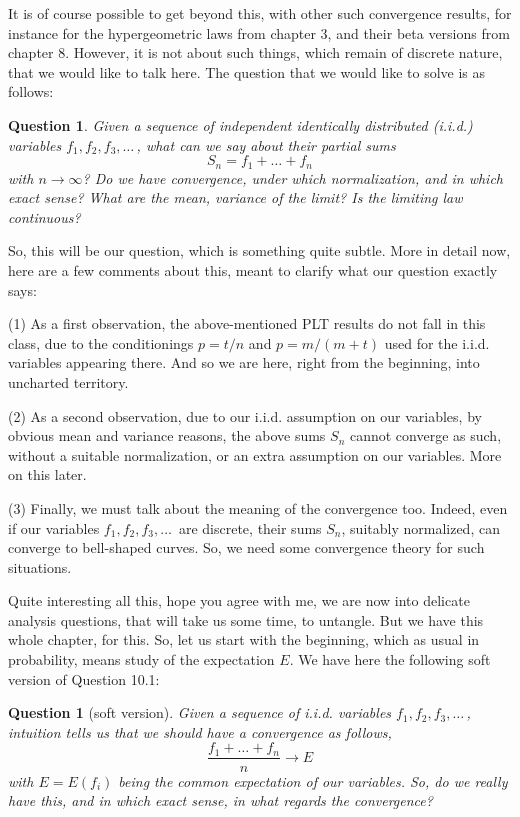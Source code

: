 \documentclass[12pt]{amsbook}
\newtheorem{question}[theorem]{Question}
\begin{document}
It is of course possible to get beyond this, with other such convergence results, for instance for the hypergeometric laws from chapter 3, and their beta versions from chapter 8. However, it is not about such things, which remain of discrete nature, that we would like to talk here. The question that we would like to solve is as follows:

\begin{question}
Given a sequence of independent identically distributed (i.i.d.) variables $f_1,f_2,f_3,\ldots\,$, what can we say about their partial sums
$$S_n=f_1+\ldots+f_n$$
with $n\to\infty$? Do we have convergence, under which normalization, and in which exact sense? What are the mean, variance of the limit? Is the limiting law continuous?
\end{question}

So, this will be our question, which is something quite subtle. More in detail now, here are a few comments about this, meant to clarify what our question exactly says:

\bigskip

(1) As a first observation, the above-mentioned PLT results do not fall in this class, due to the conditionings $p=t/n$ and $p=m/(m+t)$ used for the i.i.d. variables appearing there. And so we are here, right from the beginning, into uncharted territory.

\bigskip

(2) As a second observation, due to our i.i.d. assumption on our variables, by obvious mean and variance reasons, the above sums $S_n$ cannot converge as such, without a suitable normalization, or an extra assumption on our variables. More on this later.

\bigskip

(3) Finally, we must talk about the meaning of the convergence too. Indeed, even if our variables $f_1,f_2,f_3,\ldots\,$ are discrete, their sums $S_n$, suitably normalized, can converge to bell-shaped curves. So, we need some convergence theory for such situations.

\bigskip

Quite interesting all this, hope you agree with me, we are now into delicate analysis questions, that will take us some time, to untangle. But we have this whole chapter, for this. So, let us start with the beginning, which as usual in probability, means study of the expectation $E$. We have here the following soft version of Question 10.1:

\begin{question}[soft version]
Given a sequence of i.i.d. variables $f_1,f_2,f_3,\ldots\,$, intuition tells us that we should have a convergence as follows,
$$\frac{f_1+\ldots+f_n}{n}\to E$$
 with $E=E(f_i)$ being the common expectation of our variables. So, do we really have this, and in which exact sense, in what regards the convergence?
\end{question}
\end{document}
